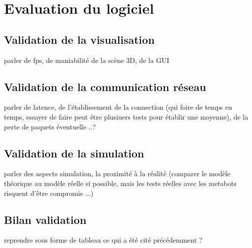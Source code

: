 \section{Evaluation du logiciel}

\subsection{Validation de la visualisation}
parler de fps, de maniabilité de la scène 3D, de la GUI

\subsection{Validation de la communication réseau}
parler de latence, de l'établissement de la connection (qui foire de temps en temps, essayer de faire peut être plusiuers tests pour établir une moyenne), de la perte de paquets éventuelle ..?

\subsection{Validation de la simulation}
parler des aspects simulation, la proximité à la réalité (comparer le modèle théorique au modèle réelle si possible, mais les tests réelles avec les metabots risquent d'être compromis ...)

\subsection{Bilan validation}
reprendre sous forme de tableau ce qui a été cité précédemment ?
